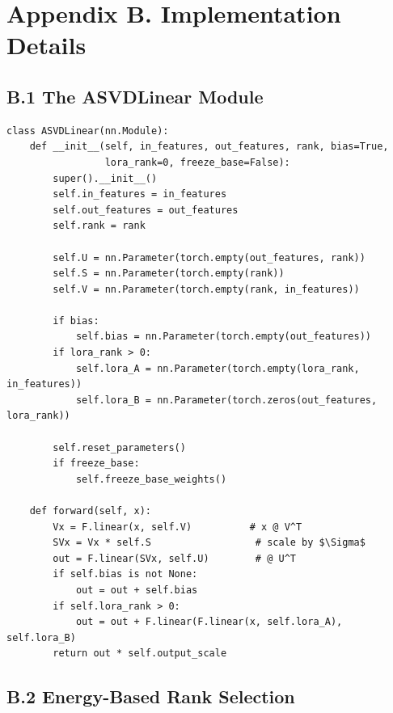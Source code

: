 
\section{Appendix B. Implementation Details}

\subsection{B.1 The ASVDLinear Module}

\begin{lstlisting}
class ASVDLinear(nn.Module):
    def __init__(self, in_features, out_features, rank, bias=True,
                 lora_rank=0, freeze_base=False):
        super().__init__()
        self.in_features = in_features
        self.out_features = out_features
        self.rank = rank
        
        self.U = nn.Parameter(torch.empty(out_features, rank))
        self.S = nn.Parameter(torch.empty(rank))
        self.V = nn.Parameter(torch.empty(rank, in_features))
        
        if bias:
            self.bias = nn.Parameter(torch.empty(out_features))
        if lora_rank > 0:
            self.lora_A = nn.Parameter(torch.empty(lora_rank, in_features))
            self.lora_B = nn.Parameter(torch.zeros(out_features, lora_rank))
        
        self.reset_parameters()
        if freeze_base:
            self.freeze_base_weights()
    
    def forward(self, x):
        Vx = F.linear(x, self.V)          # x @ V^T
        SVx = Vx * self.S                  # scale by $\Sigma$
        out = F.linear(SVx, self.U)        # @ U^T
        if self.bias is not None:
            out = out + self.bias
        if self.lora_rank > 0:
            out = out + F.linear(F.linear(x, self.lora_A), self.lora_B)
        return out * self.output_scale
\end{lstlisting}

\subsection{B.2 Energy-Based Rank Selection}

